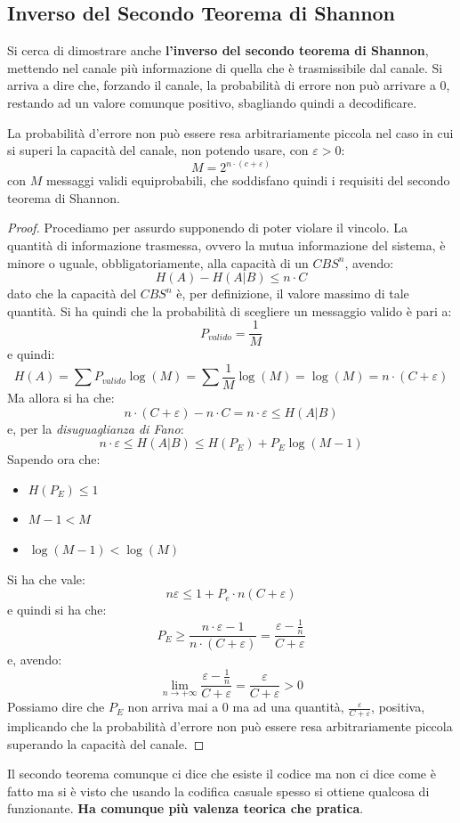 \documentclass[a4paper,12pt, oneside]{book}
\begin{document}
\subsection{Inverso del Secondo Teorema di Shannon}
Si cerca di dimostrare anche \textbf{l'inverso del secondo teorema di Shannon},
mettendo nel canale più informazione di quella che è trasmissibile dal
canale. Si arriva a dire che, forzando il canale, la probabilità di errore non
può arrivare a 0, restando ad un valore comunque positivo, sbagliando quindi a
decodificare.
\begin{teorema}
  La probabilità d'errore non può essere resa
  arbitrariamente piccola nel caso in cui si superi la capacità del canale, non
  potendo usare, con $\varepsilon>0$:
  \[M=2^{n\cdot(c+\varepsilon)}\]
  con $M$ messaggi validi equiprobabili, che soddisfano quindi i requisiti del
  secondo teorema di Shannon. 
\end{teorema}
\begin{proof}
  Procediamo per assurdo supponendo di poter violare il vincolo. La quantità di
  informazione trasmessa, ovvero la mutua informazione del sistema, è minore o
  uguale, obbligatoriamente, alla capacità di un $CBS^n$, avendo:
  \[H(A)-H(A|B)\leq n\cdot C\]
  dato che la capacità del $CBS^n$ è, per definizione, il valore massimo di tale
  quantità. Si ha quindi che la probabilità di scegliere un messaggio valido è
  pari a:
  \[P_{valido}=\frac{1}{M}\]
  e quindi:
  \[H(A)=\sum P_{valido}\log (M)=\sum\frac{1}{M}\log(M)=\log(M)=n\cdot
    (C+\varepsilon)\]
  Ma allora si ha che:
  \[n\cdot(C+\varepsilon)-n\cdot C=n\cdot \varepsilon\leq H(A|B)\]
  e, per la \emph{disuguaglianza di Fano}:
  \[n\cdot \varepsilon\leq H(A|B)\leq H(P_E)+P_E\log(M-1)\]
  Sapendo ora che:
  \begin{itemize}
    \item $H(P_E)\leq 1$
    \item $M-1<M$
    \item $\log(M-1)<\log(M)$
  \end{itemize}
  Si ha che vale:
  \[n\varepsilon\leq 1+P_e\cdot n(C+\varepsilon)\]
  e quindi si ha che:
  \[P_E\geq\frac{n\cdot\varepsilon-1}{n\cdot
      (C+\varepsilon)}=\frac{\varepsilon-\frac{1}{n}}{C+\varepsilon}\]
  e, avendo:
  \[\lim_{n\to
      +\infty}\frac{\varepsilon-\frac{1}{n}}{C+\varepsilon}=
    \frac{\varepsilon}{C+\varepsilon}>0\]
  Possiamo dire che $P_E$ non arriva mai a 0 ma ad una quantità,
  $\frac{\varepsilon}{C+\varepsilon}$, positiva, implicando che la probabilità
  d'errore non può essere resa arbitrariamente piccola superando la capacità del
  canale. 
\end{proof}
Il secondo teorema comunque ci dice che esiste il codice ma non ci dice come è
fatto ma si è 
visto che usando la codifica casuale spesso si ottiene qualcosa di
funzionante. \textbf{Ha comunque più valenza teorica che pratica}.
\end{document}
